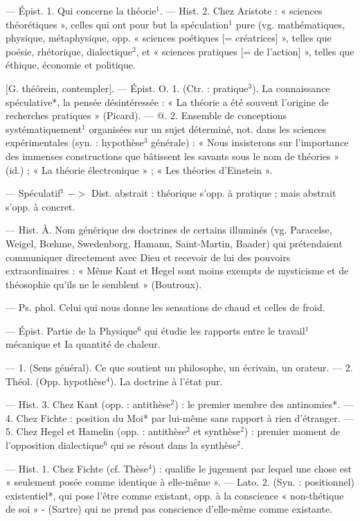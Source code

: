\begin{itemize}[leftmargin=1cm, label=, itemsep=1pt]
 — Épist. 1. Qui concerne
la théorie$^1$. — Hist. 2. Chez Aristote :
« sciences théorétiques », celles qui
ont pour but la spéculation$^1$ pure
(vg. mathématiques, physique, métaphysique, opp. « sciences poétiques [= créatrices] », telles que
poésie, rhétorique, dialectique$^2$, et
« sciences pratiques [= de l'action] »,
telles que éthique, économie et politique.

 [G. théôrein, contempler]. —
Épist. O. 1. (Ctr. : pratique$^3$). La
connaissance spéculative*, la pensée
désintéressée : « La théorie a été
souvent l’origine de recherches pratiques » (Picard). — @. 2. Ensemble
de conceptions systématiquement$^1$
organisées sur un sujet déterminé,
not. dans les sciences expérimentales
(syn. : hypothèse$^3$ générale) : « Nous
insisterons sur l'importance des
immenses constructions que bâtissent les savants sous le nom de
théories » (id.) ; « La théorie électronique » ; « Les théories d’Einstein ».

 — Spéculatif$^1$ $->$ Dist.
abstrait : théorique s’opp. à pratique ; mais abstrait s'opp. à concret.

 — Hist. À. Nom générique
des doctrines de certains illuminés
(vg. Paracelse, Weigel, Bœhme,
Swedenborg, Hamann, Saint-Martin,
Baader) qui prétendaient communiquer directement avec Dieu et
recevoir de lui des pouvoirs extraordinaires :
« Même Kant et Hegel
sont moins exempts de mysticisme
et de théosophie qu'ils ne le semblent » (Boutroux).

 — Ps. phol. Celui
qui nous donne les sensations de
chaud et celles de froid.

 — Épist. Partie
de la Physique$^6$ qui étudie les rapports
entre le travail$^1$ mécanique et Ia
quantité de chaleur.

 — 1. (Sens général). Ce que
soutient un philosophe, un écrivain,
un orateur. — 2. Théol. (Opp.
hypothèse$^4$). La doctrine à l'état pur.

— Hist. 3. Chez Kant (opp. : antithèse$^2$) : le premier membre des antinomies*. — 4. Chez Fichte : position du Moi* par lui-même sans
rapport à rien d’étranger. — 5. Chez
Hegel et Hamelin (opp. : antithèse$^2$
et synthèse$^2$) : premier moment de
l'opposition dialectique$^6$ qui se résout dans la synthèse$^2$.

 — Hist. 1. Chez Fichte (cf.
Thèse$^4$) : qualifie le jugement par
lequel une chose est « seulement
posée comme identique à elle-même ». — Lato. 2. (Syn. : positionnel) existentiel*, qui pose
l'être comme existant, opp. à la
conscience « non-thétique de soi »
- (Sartre) qui ne prend pas conscience
d’elle-même comme existante.


\end{itemize}
